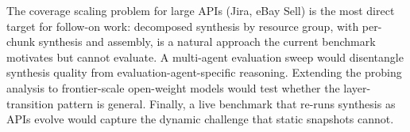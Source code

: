 \documentclass[12pt]{report}
\begin{document}
The coverage scaling problem for large APIs (Jira, eBay Sell) is the most
direct target for follow-on work: decomposed synthesis by resource group,
with per-chunk synthesis and assembly, is a natural approach the current
benchmark motivates but cannot evaluate. A multi-agent evaluation sweep
would disentangle synthesis quality from evaluation-agent-specific reasoning.
Extending the probing analysis to frontier-scale open-weight models would
test whether the layer-transition pattern is general. Finally, a live
benchmark that re-runs synthesis as APIs evolve would capture the dynamic
challenge that static snapshots cannot.



\end{document}
